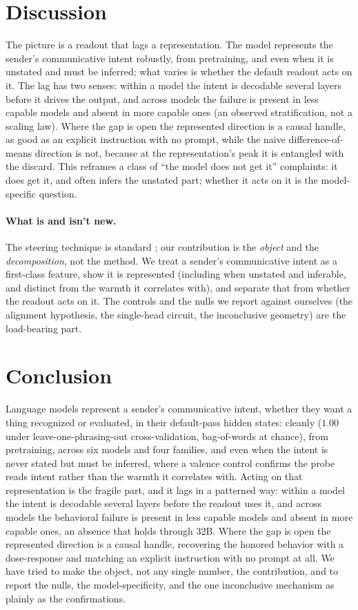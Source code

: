\documentclass[11pt]{article}
\begin{document}
\section{Discussion}
The picture is a readout that lags a representation. The model represents the sender's communicative intent
robustly, from pretraining, and even when it is unstated and must be inferred; what varies is whether the
default readout acts on it. The lag has two senses: within a model the intent is decodable several layers
before it drives the output, and across models the failure is present in less capable models and absent in more
capable ones (an observed stratification, not a scaling law). Where the gap is open the represented direction is
a causal handle, as good as an explicit instruction with no prompt, while the naive difference-of-means
direction is not, because at the representation's peak it is entangled with the discard. This reframes a class
of ``the model does not get it'' complaints: it does get it, and often infers the unstated part; whether it
acts on it is the model-specific question.

\paragraph{What is and isn't new.} The steering technique is standard
\citep{turner2023actadd,li2023iti,rimsky2024caa,zou2023repe}; our contribution is the \emph{object} and the
\emph{decomposition}, not the method. We treat a sender's communicative intent as a first-class feature, show it
is represented (including when unstated and inferable, and distinct from the warmth it correlates with), and
separate that from whether the readout acts on it. The controls and the nulls we report against ourselves (the
alignment hypothesis, the single-head circuit, the inconclusive geometry) are the load-bearing part.

\section{Conclusion}
Language models represent a sender's communicative intent, whether they want a thing recognized or evaluated,
in their default-pass hidden states: cleanly ($1.00$ under leave-one-phrasing-out cross-validation, bag-of-words
at chance), from pretraining, across six models and four families, and even when the intent is never stated but
must be inferred, where a valence control confirms the probe reads intent rather than the warmth it correlates
with. Acting on that representation is the fragile part, and it lags in a patterned way: within a model the
intent is decodable several layers before the readout uses it, and across models the behavioral failure is
present in less capable models and absent in more capable ones, an absence that holds through 32B. Where the gap is open the
represented direction is a causal handle, recovering the honored behavior with a dose-response and matching an
explicit instruction with no prompt at all. We have tried to make the object, not any single number, the
contribution, and to report the nulls, the model-specificity, and the one inconclusive mechanism as plainly as
the confirmations.
\end{document}
